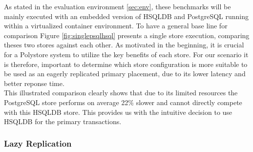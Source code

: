 As stated in the evaluation environment \ref{sec:env}, these benchmarks will be mainly executed with an embedded version of HSQLDB and PostgreSQL running within a virtualized 
container environment. To have a general base line for comparison Figure \ref{fig:singlepsqlhsql} presents a single store execution, comparing theses two stores against each other.
As motivated in the beginning, it is crucial for a Polystore system to utilize the key benefits of each store. For our scenario it is therefore, important to determine which 
store configuration is more suitable to be used as an eagerly replicated primary placement, due to its lower latency and better reponse time.\\
This illustrated comparison clearly shows that due to its limited resources the PostgreSQL store
performs on average 22\% slower and cannot directly compete with this HSQLDB store.
This provides us with the intuitive decision to use HSQLDB for the primary transactions.








\subsubsection{Lazy Replication} 


